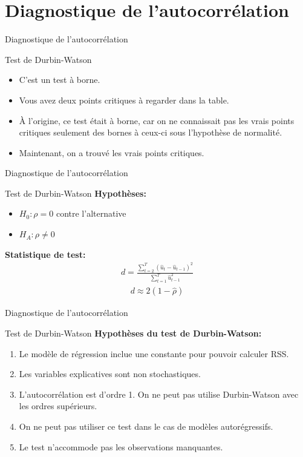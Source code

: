 \documentclass{beamer}
\begin{document}
\section{Diagnostique de l'autocorrélation}

\frame{\tableofcontents[current]}


\begin{frame}{Diagnostique de l'autocorrélation}
\begin{block}{Test de Durbin-Watson}
\begin{itemize}
\item C’est un test à borne. 
\item Vous avez deux points critiques à regarder dans la table.
\item À l’origine, ce test était à borne, car on ne connaissait pas les vrais points critiques seulement des bornes à ceux-ci sous l’hypothèse de normalité.
\item Maintenant, on a trouvé les vrais points critiques.
\end{itemize}
\end{block}
\end{frame}

\begin{frame}{Diagnostique de l'autocorrélation}
\begin{block}{Test de Durbin-Watson}
\textbf{Hypothèses:}
\begin{itemize}
\item $H_0: \rho=0$ contre l'alternative
\item $H_A: \rho \neq 0$
\end{itemize}
\textbf{Statistique de test:}
\begin{align*}
d=\frac{\sum_{t=2}^T(\hat{u}_t-\hat{u}_{t-1})^2}{\sum_{t=1}^T\hat{u}_{t-1}^2}
\end{align*}
\begin{align*}
d \approx 2(1-\hat{\rho})
\end{align*}
\end{block}
\end{frame}


\begin{frame}{Diagnostique de l'autocorrélation}
\begin{block}{Test de Durbin-Watson}
\textbf{Hypothèses du test de Durbin-Watson:}
\begin{enumerate}
\item Le modèle de régression inclue une constante pour pouvoir calculer RSS.
\item Les variables explicatives sont non stochastiques.
\item L’autocorrélation est d’ordre 1. On ne peut pas utilise Durbin-Watson avec les ordres supérieurs.
\item On ne peut pas utiliser ce test dans le cas de modèles autorégressifs.
\item Le test n’accommode pas les observations manquantes.
\end{enumerate}
\end{block}
\end{frame}
\end{document}

